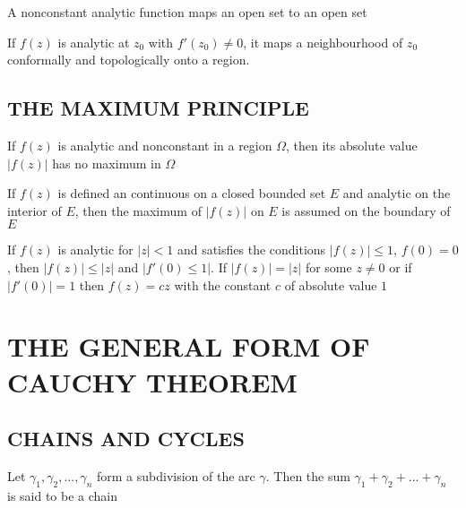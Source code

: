 \documentclass{report}
\begin{document}
\begin{corollary}
    A nonconstant analytic function maps an open set to an open set
\end{corollary}

\begin{corollary}
    If $f(z)$ is analytic at $z_0$ with $f'(z_0) \neq 0$, it maps a neighbourhood of $z_0$ conformally and topologically onto a region.
\end{corollary}

\subsection{THE MAXIMUM PRINCIPLE}

\begin{theorem}
    If $f(z)$ is analytic and nonconstant in a region $\Omega$, then its absolute value $|f(z)|$ has no maximum in $\Omega$
\end{theorem}

\begin{theorem}
    If $f(z)$ is defined an continuous on a closed bounded set $E$ and analytic on the interior of $E$, then the maximum of $|f(z)|$ on $E$ is assumed on the boundary of $E$
\end{theorem}

\begin{theorem}
    If $f(z)$ is analytic for $|z| < 1$ and satisfies the conditions $|f(z)| \leq 1$, $f(0) = 0$, then $|f(z)| \leq |z|$ and $|f'(0) \leq 1|$. If $|f(z)| = |z|$ for some $z \neq 0$ or if $|f'(0)| = 1$ then $f(z) = cz$ with the constant $c$ of absolute value $1$
\end{theorem}

\section{THE GENERAL FORM OF CAUCHY THEOREM}

\subsection{CHAINS AND CYCLES}

\begin{definition}[Chains]
    Let $\gamma_1, \gamma_2, ..., \gamma_n$ form a subdivision of the arc $\gamma$. Then the sum $\gamma_1 + \gamma_2 + ... + \gamma_n$ is said to be a chain
\end{definition}
\end{document}
